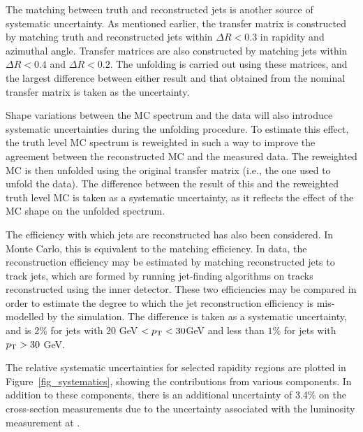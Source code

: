 The matching between truth and reconstructed jets is another source of systematic uncertainty. As mentioned earlier, the transfer matrix is constructed by matching truth and reconstructed jets within $\Delta R < 0.3$ in rapidity and azimuthal angle. Transfer matrices are also constructed by matching jets within $\Delta R < 0.4$ and $\Delta R < 0.2$. The unfolding is carried out using these matrices, and the largest difference between either result and that obtained from the nominal transfer matrix is taken as the uncertainty.

Shape variations between the MC spectrum and the data will also introduce systematic uncertainties during the unfolding procedure. To estimate this effect, the truth level MC spectrum is reweighted in such a way to improve the agreement between the reconstructed MC and the measured data. The reweighted MC is then unfolded using the original transfer matrix (i.e., the one used to unfold the data). The difference between the result of this  and the reweighted truth level MC is taken as a systematic uncertainty, as it reflects the effect of the MC shape on the unfolded spectrum.

The efficiency with which jets are reconstructed has also been considered. In Monte Carlo, this is equivalent to the matching efficiency. In data, the reconstruction efficiency may be estimated by matching reconstructed jets to track jets, which are formed by running jet-finding algorithms on tracks reconstructed using the inner detector. These two efficiencies may be compared in order to estimate the degree to which the jet reconstruction efficiency is mis-modelled by the simulation. The difference is taken as a systematic uncertainty, and is 2\% for jets with $20 $ GeV $< p_{\mathrm{T}} < 30 $GeV and less than $1\%$ for jets with $p_{\mathrm{T}} > 30$ GeV.

The relative systematic uncertainties for selected rapidity regions are plotted in Figure~\ref{fig_systematics}, showing the contributions from various components. In addition to these components, there is an additional uncertainty of 3.4\% on the cross-section measurements due to the uncertainty associated with the luminosity measurement at \atlas.

